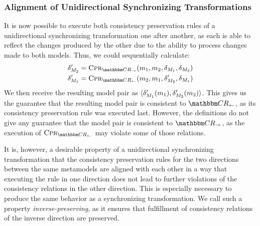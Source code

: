 \subsubsection{Alignment of Unidirectional Synchronizing Transformations}

It is now possible to execute both consistency preservation rules of a unidirectional synchronizing transformation one after another, as each is able to reflect the changes produced by the other due to the ability to process changes made to both models.
Thus, we could sequentially calculate:
\begin{align*}
    &
    \change{\metamodel{M}{2}}' = \consistencypreservationrule{\consistencyrelationset{CR}_{\rightarrow}}(\model{m}{1},\model{m}{2},\change{\metamodel{M}{1}},\change{\metamodel{M}{2}})\\
    &
    \change{\metamodel{M}{1}}' = \consistencypreservationrule{\consistencyrelationset{CR}_{\leftarrow}}(\model{m}{2},\model{m}{1},\change{\metamodel{M}{2}}',\change{\metamodel{M}{1}})
\end{align*}
We then receive the resulting model pair as $\langle \delta_{M_{1}}'(m_{1}), \delta_{M_{2}}'(m_{2}) \rangle$.
This gives us the guarantee that the resulting model pair is consistent to $\consistencyrelationset{CR}_{\leftarrow}$, as its consistency preservation rule was executed last.
However, the definitions do not give any guarantee that the model pair is consistent to $\consistencyrelationset{CR}_{\rightarrow}$, as the execution of $\consistencypreservationrule{\consistencyrelationset{CR}_{\leftarrow}}$ may violate some of those relations.

It is, however, a desirable property of a unidirectional synchronizing transformation that the consistency preservation rules for the two directions between the same metamodels are aligned with each other in a way that executing the rule in one direction does not lead to further violations of the consistency relations in the other direction.
This is especially necessary to produce the same behavior as a synchronizing transformation.
We call such a property \emph{inverse-preserving}, as it ensures that fulfillment of consistency relations of the inverse direction are preserved.

